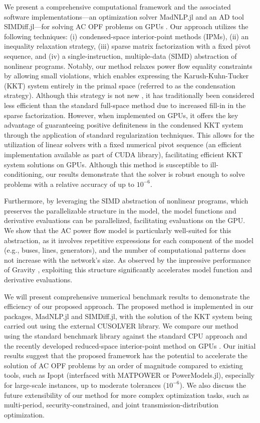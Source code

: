 We present a comprehensive computational framework and the associated software implementations---an optimization solver MadNLP.jl and an AD tool SIMDiff.jl---for solving AC OPF problems on GPUs \cite{madnlp, simdiff}. Our approach utilizes the following techniques: (i) condensed-space interior-point methods (IPMs), (ii) an inequality relaxation strategy, (iii) sparse matrix factorization with a fixed pivot sequence, and (iv) a single-instruction, multiple-data (SIMD) abstraction of nonlinear programs. Notably, our method relaxes power flow equality constraints by allowing small violations, which enables expressing the Karush-Kuhn-Tucker (KKT) system entirely in the primal space (referred to as the condensation strategy). Although this strategy is not new \cite{nocedal2006numerical}, it has traditionally been considered less efficient than the standard full-space method due to increased fill-in in the sparse factorization. However, when implemented on GPUs, it offers the key advantage of guaranteeing positive definiteness in the condensed KKT system through the application of standard regularization techniques. This allows for the utilization of linear solvers with a fixed numerical pivot sequence (an efficient implementation available as part of CUDA library), facilitating efficient KKT system solutions on GPUs. Although this method is susceptible to ill-conditioning, our results demonstrate that the solver is robust enough to solve problems with a relative accuracy of up to $10^{-6}$.

Furthermore, by leveraging the SIMD abstraction of nonlinear programs, which preserves the parallelizable structure in the model, the model functions and derivative evaluations can be parallelized, facilitating evaluations on the GPU. We show that the AC power flow model is particularly well-suited for this abstraction, as it involves repetitive expressions for each component of the model (e.g., buses, lines, generators), and the number of computational patterns does not increase with the network's size. As observed by the impressive performance of Gravity \cite{hijazi2018gravity}, exploiting this structure significantly accelerates model function and derivative evaluations.

We will present comprehensive numerical benchmark results to demonstrate the efficiency of our proposed approach. The proposed method is implemented in our packages, MadNLP.jl and SIMDiff.jl, with the solution of the KKT system being carried out using the external CUSOLVER library. We compare our method using the standard benchmark library \cite{pglib} against the standard CPU approach \cite{wachter2006implementation} and the recently developed reduced-space interior-point method on GPUs \cite{pacaud2022condensed} . Our initial results suggest that the proposed framework has the potential to accelerate the solution of AC OPF problems by an order of magnitude compared to existing tools, such as Ipopt (interfaced with MATPOWER or PowerModels.jl), especially for large-scale instances, up to moderate tolerances ($10^{-6}$). We also discuss the future extensibility of our method for more complex optimization tasks, such as multi-period, security-constrained, and joint transmission-distribution optimization.

\newpage







